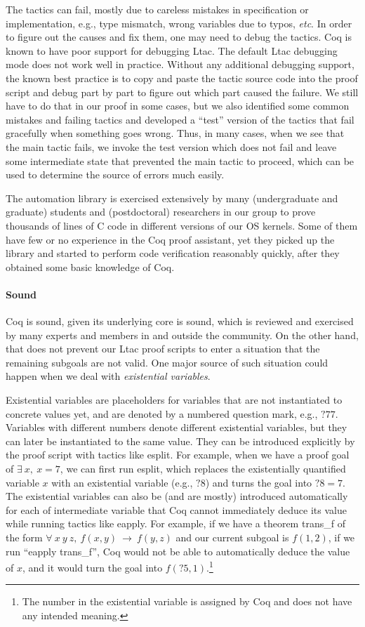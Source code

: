 The tactics can fail, mostly due to careless mistakes in specification or implementation,
e.g., type mismatch, wrong variables due to typos, {\it etc}. In order to figure
out the causes and fix them, one may need to debug the tactics. Coq is known to
have poor support for debugging Ltac. The default Ltac debugging mode does not
work well in practice. Without any additional debugging support, the known best
practice is to copy and paste the tactic source code into the proof script
and debug part by part to figure out which part caused the failure.
We still have to do that in our proof in some cases, but we also identified
some common mistakes and failing tactics and developed a ``test'' version of
the tactics that fail gracefully when
something goes wrong. Thus, in many cases, when we see that the main tactic
fails, we invoke the test version which does not fail and leave some intermediate
state that prevented the main tactic to proceed, which can be used to determine
the source of errors much easily.

The automation library is exercised extensively by many (undergraduate and graduate)
students and (postdoctoral) researchers in our group to prove thousands of
lines of C code in different versions of our OS kernels. Some of them have few or no
experience in the Coq proof
assistant, yet they picked up the library and started to perform code verification
reasonably quickly, after they obtained some basic knowledge of Coq.

\paragraph{Sound}
Coq is sound, given its underlying core is sound, which is reviewed and exercised
by many experts and members in and outside the community. On the other hand,
that does not prevent our Ltac proof scripts to enter a situation that the remaining
subgoals are not valid. One major source of such situation could happen when we
deal with {\it existential variables}. 

Existential variables are placeholders for
variables that are not instantiated to concrete values yet, and are
denoted by a numbered question mark, e.g., $?77$. Variables with different numbers
denote different existential variables, but they can later be instantiated to
the same value. They can be introduced explicitly by the proof script with
tactics like \textsf{esplit}. For example, when we have a proof goal of
$\exists~x,~x=7$, we can first run \textsf{esplit}, which replaces the existentially
quantified variable $x$ with an existential variable (e.g., $?8$) and turns the
goal into $?8=7$. The existential variables can also be (and are mostly) introduced
automatically for each of intermediate variable that Coq cannot immediately
deduce its value while running tactics like \textsf{eapply}.
For example, if we have a theorem \textsf{trans\_f} of the form
$\forall~x~y~z,~f(x,y)~\rightarrow~f(y,z)$ and our current subgoal is $f(1,2)$,
if we run ``\textsf{eapply} \textsf{trans\_f}'', Coq would not be able to
automatically deduce the value of $x$, and it would turn the goal into
$f(?5, 1)$.\footnote{The number in the existential variable is assigned by
Coq and does not have any intended meaning.}

